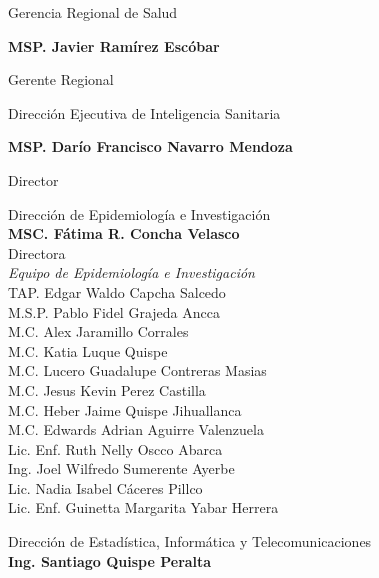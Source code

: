 \documentclass[12pt,a4paper,openany]{book}
\begin{document}
	\begin{center}
		
		{\large Gerencia Regional de Salud}
		
		\textbf{MSP. Javier Ramírez Escóbar}
		
		Gerente Regional \vspace{1.0cm}
		
		Dirección Ejecutiva de Inteligencia Sanitaria
		
		\textbf{MSP. Darío Francisco Navarro Mendoza}
		
		Director
		
		\vspace{1.5cm}
		\noindent
		\begin{minipage}[t]{.45\textwidth}
			\centering
			Dirección de Epidemiología e Investigación  \\
			\textbf{MSC. Fátima R. Concha Velasco}\\
			Directora \vspace{0.8cm}\\
			\textit{Equipo de Epidemiología e Investigación }\vspace{.4cm}\\
			TAP. Edgar Waldo Capcha Salcedo \\
			M.S.P. Pablo Fidel Grajeda Ancca \\
			M.C. Alex Jaramillo Corrales \\ 
			M.C. Katia Luque Quispe \\
			M.C. Lucero Guadalupe Contreras Masias \\
			M.C. Jesus Kevin Perez Castilla \\
			M.C. Heber Jaime Quispe Jihuallanca \\
			M.C. Edwards Adrian Aguirre Valenzuela \\
			Lic. Enf. Ruth Nelly Oscco Abarca \\
			Ing. Joel Wilfredo Sumerente Ayerbe \\
			Lic. Nadia Isabel Cáceres Pillco \\
			Lic. Enf. Guinetta Margarita Yabar Herrera \vspace{1.5cm}\\	
		\end{minipage}
		\hfill
		\noindent
		\begin{minipage}[t]{.45\textwidth}
			\centering
			Dirección de Estadística, Informática y Telecomunicaciones\\
			\textbf{Ing. Santiago Quispe Peralta} \\

\end{minipage}
\end{center}
\end{document}
